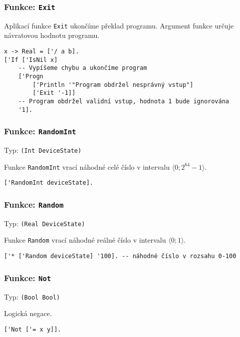 \subsubsection*{Funkce: \lstinline{Exit}}

Aplikací funkce \lstinline{Exit} ukončíme překlad programu. Argument funkce určuje návratovou
hodnotu programu.

\begin{lstlisting}[caption={Ukázka využití Exit}]
x -> Real = ['/ a b].
['If ['IsNil x]
    -- Vypíšeme chybu a ukončíme program
    ['Progn
        ['Println '"Program obdržel nesprávný vstup"]
        ['Exit '-1]]
    -- Program obdržel validní vstup, hodnota 1 bude ignorována
    '1].
\end{lstlisting}

\subsubsection*{Funkce: \lstinline{RandomInt}}
Typ: \lstinline{(Int DeviceState)}

Funkce \lstinline{RandomInt} vrací náhodné celé číslo v intervalu $\bigl \langle 0; 2^{64}-1 \bigr \rangle$.

\begin{lstlisting}[caption={Ukázka využití RandomInt}]
['RandomInt deviceState].
\end{lstlisting}

\subsubsection*{Funkce: \lstinline{Random}}
Typ: \lstinline{(Real DeviceState)}

Funkce \lstinline{Random} vrací náhodné reálné číslo v intervalu $\bigl \langle 0; 1 \bigr \rangle$.

\begin{lstlisting}[caption={Ukázka využití Random}]
['* ['Random deviceState] '100]. -- náhodné číslo v rozsahu 0-100
\end{lstlisting}

\subsubsection*{Funkce: \lstinline{Not}}
Typ: \lstinline{(Bool Bool)}

Logická negace.

\begin{lstlisting}[caption={Ukázka využití Not}]
['Not ['= x y]].
\end{lstlisting}

